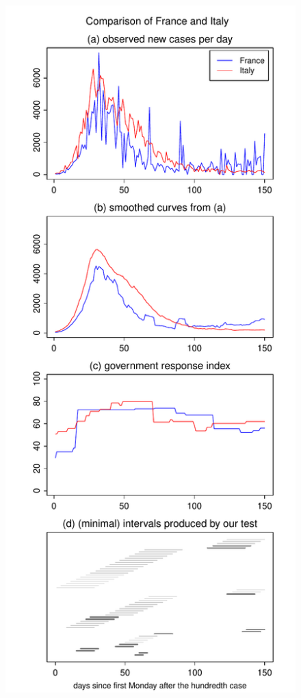 \documentclass[a4paper,12pt]{article}
\numberwithin{equation}{section}
\begin{document}
{\begin{figure}[h!]
\begin{minipage}[t]{0.49\textwidth}
\includegraphics[width=\textwidth]{plots/FRA_vs_ITA_wa}

\end{minipage}
\end{figure}}
\end{document}
